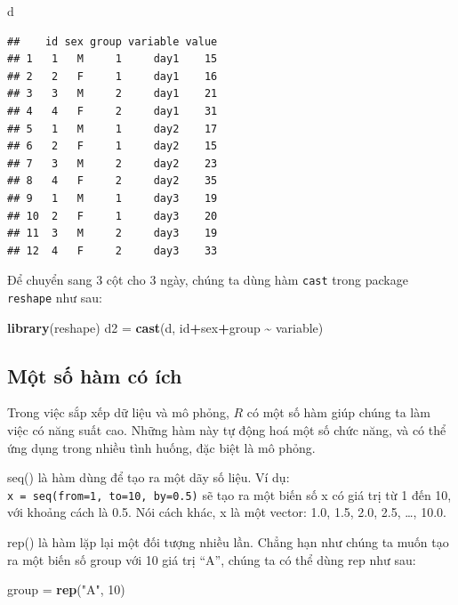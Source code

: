 \documentclass[
]{book}
\newenvironment{Shaded}{\begin{snugshade}}{\end{snugshade}}
\newcommand{\DecValTok}[1]{\textcolor[rgb]{0.00,0.00,0.81}{#1}}
\newcommand{\KeywordTok}[1]{\textcolor[rgb]{0.13,0.29,0.53}{\textbf{#1}}}
\newcommand{\NormalTok}[1]{#1}
\newcommand{\OperatorTok}[1]{\textcolor[rgb]{0.81,0.36,0.00}{\textbf{#1}}}
\newcommand{\StringTok}[1]{\textcolor[rgb]{0.31,0.60,0.02}{#1}}
\begin{document}
\begin{Shaded}
\begin{Highlighting}[]
\NormalTok{d}
\end{Highlighting}
\end{Shaded}

\begin{verbatim}
##    id sex group variable value
## 1   1   M     1     day1    15
## 2   2   F     1     day1    16
## 3   3   M     2     day1    21
## 4   4   F     2     day1    31
## 5   1   M     1     day2    17
## 6   2   F     1     day2    15
## 7   3   M     2     day2    23
## 8   4   F     2     day2    35
## 9   1   M     1     day3    19
## 10  2   F     1     day3    20
## 11  3   M     2     day3    19
## 12  4   F     2     day3    33
\end{verbatim}

Để chuyển sang 3 cột cho 3 ngày, chúng ta dùng hàm \texttt{cast} trong package \texttt{reshape} như sau:

\begin{Shaded}
\begin{Highlighting}[]
\KeywordTok{library}\NormalTok{(reshape)}
\NormalTok{d2 =}\StringTok{ }\KeywordTok{cast}\NormalTok{(d, id}\OperatorTok{+}\NormalTok{sex}\OperatorTok{+}\NormalTok{group }\OperatorTok{\textasciitilde{}}\StringTok{ }\NormalTok{variable)}
\end{Highlighting}
\end{Shaded}

\hypertarget{mux1ed9t-sux1ed1-huxe0m-cuxf3-uxedch}{%
\subsection{Một số hàm có ích}\label{mux1ed9t-sux1ed1-huxe0m-cuxf3-uxedch}}

Trong việc sắp xếp dữ liệu và mô phỏng, \(R\) có một số hàm giúp chúng ta làm việc có năng suất cao. Những hàm này tự động hoá một số chức năng, và có thể ứng dụng trong nhiều tình huống, đặc biệt là mô phỏng.

{seq()} là hàm dùng để tạo ra một dãy số liệu. Ví dụ: \texttt{x\ =\ seq(from=1,\ to=10,\ by=0.5)} sẽ tạo ra một biến số x có giá trị từ 1 đến 10, với khoảng cách là 0.5. Nói cách khác, x là một vector: 1.0, 1.5, 2.0, 2.5, \ldots, 10.0.

{rep()} là hàm lặp lại một đối tượng nhiều lần. Chẳng hạn như chúng ta muốn tạo ra một biến số group với 10 giá trị ``A'', chúng ta có thể dùng rep như sau:

\begin{Shaded}
\begin{Highlighting}[]
\NormalTok{group =}\StringTok{ }\KeywordTok{rep}\NormalTok{(}\StringTok{"A"}\NormalTok{, }\DecValTok{10}\NormalTok{)}
\end{Highlighting}
\end{Shaded}
\end{document}
